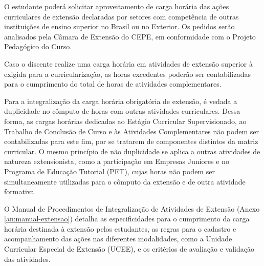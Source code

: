 O estudante poderá solicitar aproveitamento de carga horária das ações curriculares de extensão declaradas por setores com competência de outras instituições de ensino superior no Brasil ou no Exterior. Os pedidos serão analisados pela Câmara de Extensão do CEPE, em conformidade com o Projeto Pedagógico do Curso.

Caso o discente realize uma carga horária em atividades de extensão superior à exigida para a curricularização, as horas excedentes poderão ser contabilizadas para o cumprimento do total de horas de atividades complementares.

Para a integralização da carga horária obrigatória de extensão, é vedada a duplicidade no cômputo de horas com outras atividades curriculares. Dessa forma, as cargas horárias dedicadas ao Estágio Curricular Supervisionado, ao Trabalho de Conclusão de Curso e às Atividades Complementares não podem ser contabilizadas para este fim, por se tratarem de componentes distintos da matriz curricular. O mesmo princípio de não duplicidade se aplica a outras atividades de natureza extensionista, como a participação em Empresas Juniores e no Programa de Educação Tutorial (PET), cujas horas não podem ser simultaneamente utilizadas para o cômputo da extensão e de outra atividade formativa.
 



O Manual de Procedimentos de Integralização de Atividades de Extensão (Anexo \ref{an:manual-extensao}) detalha as especificidades para o cumprimento da carga horária destinada à extensão pelos estudantes, as regras para o cadastro e acompanhamento das ações nas diferentes modalidades, como a Unidade Curricular Especial de Extensão (UCEE), e os critérios de avaliação e validação das atividades.